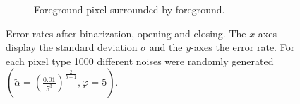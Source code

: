 \begin{figure}[H]
\begin{subfigure}[t]{0.48\linewidth}
		\caption{Foreground pixel surrounded by foreground.}
		\label{fig: relaxed_alpha0.01_phi5_foreground_free}
	\end{subfigure}
	\caption{Error rates after binarization, opening and closing. The $x$-axes display the standard deviation $\sigma$ and the $y$-axes the error rate. For each pixel type 1000 different noises were randomly generated $\left( \tilde{\alpha} = \left( \frac{0.01}{5^3} \right)^{\frac{2}{5 + 1}}, \varphi = 5 \right)$.}
	\label{fig: relaxed_alpha0.01_phi5}
\end{figure}